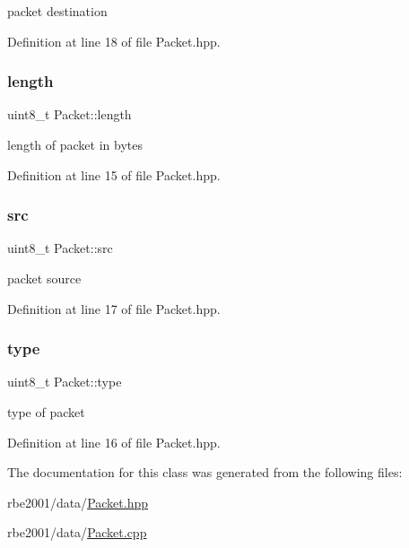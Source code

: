 packet destination 



Definition at line 18 of file Packet.\+hpp.

\mbox{\label{class_packet_adf5f5bae43f927d2977833232f4b9562}} 
\subsubsection{\texorpdfstring{length}{length}}
{\footnotesize\ttfamily uint8\+\_\+t Packet\+::length\hspace{0.3cm}{\ttfamily [private]}}



length of packet in bytes 



Definition at line 15 of file Packet.\+hpp.

\mbox{\label{class_packet_a7dc8f5be9690e925a11839c3e7869eef}} 
\subsubsection{\texorpdfstring{src}{src}}
{\footnotesize\ttfamily uint8\+\_\+t Packet\+::src\hspace{0.3cm}{\ttfamily [private]}}



packet source 



Definition at line 17 of file Packet.\+hpp.

\mbox{\label{class_packet_a496cc4e5c913eefa002539663d147cfb}} 
\subsubsection{\texorpdfstring{type}{type}}
{\footnotesize\ttfamily uint8\+\_\+t Packet\+::type\hspace{0.3cm}{\ttfamily [private]}}



type of packet 



Definition at line 16 of file Packet.\+hpp.



The documentation for this class was generated from the following files\+:\begin{DoxyCompactItemize}
\item 
rbe2001/data/\hyperlink{_packet_8hpp}{Packet.\+hpp}\item 
rbe2001/data/\hyperlink{_packet_8cpp}{Packet.\+cpp}\end{DoxyCompactItemize}
